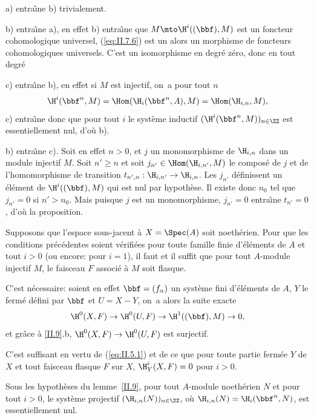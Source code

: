 a) entra\^\i ne b) trivialement.

b) entra\^\i ne a), en effet b) entra\^\i ne que $M\mto\H^i((\bbf), M)$ est un foncteur cohomologique universel, (\ref{eq:II.7.6}) est un alors un morphisme de foncteurs cohomologiques universels. C'est un isomorphisme en degr\'e z\'ero, donc en tout degr\'e

c) entra\^\i ne b), en effet si $M$ est injectif, on~a pour tout $n$
\begin{equation*} \H^i(\bbf^n, M)=\Hom(\H_i(\bbf^n, A), M) = \Hom(\H_{i, n}, M),
\end{equation*}
c) entra\^\i ne donc que pour tout $i$ le syst\`eme inductif $(\H^i(\bbf^n, M))_{n\in\ZZ}$ est essentiellement nul, d'o\`u b).

b) entra\^\i ne c). Soit en effet $n>0$, et $j$ un monomorphisme de $\H_{i, n}$ dans un module injectif $M$. Soit $n'\geq n$ et soit $j_{n'}\in\Hom(\H_{i, n'}, M)$ le compos\'e de $j$ et de l'homomorphisme de transition $t_{n', n}:\H_{i, n'}\to\H_{i, n}$. Les $j_{n'}$ d\'efinissent un \'el\'ement de $\H^i((\bbf), M)$ qui est nul par hypoth\`ese. Il existe donc $n_0$ tel que $j_{n'}=0$ si $n'>n_0$. Mais puisque $j$ est un monomorphisme, $j_{n'}=0$ entra\^\i ne $t_{n'}=0$, d'o\`u la proposition.

\begin{supcorollaire} \label{II.10} Supposons que l'espace sous-jacent \`a $X=\Spec(A)$ soit noeth\'erien. Pour que les conditions pr\'ec\'edentes soient v\'erifi\'ees pour toute famille finie d'\'el\'ements de $A$ et tout $i>0$ (ou encore: pour $i=1$), il faut et il suffit que pour tout $A$-module injectif $M$, le faisceau $F$ associ\'e \`a $M$ soit flasque.
\end{supcorollaire}

C'est n\'ecessaire: soient en effet $\bbf=(f_{\alpha})$ un syst\`eme fini d'\'el\'ements de $A$, $Y$ le ferm\'e d\'efini par $\bbf$ et $U=X-Y$, on~a alors la suite exacte
\begin{equation*} \H^0(X, F) \to \H^0(U, F) \to \H^1((\bbf), M) \to 0,
\end{equation*}
et gr\^ace \`a \ref{II.9}.b, $\H^0(X, F)\to\H^0(U, F)$ est surjectif.

C'est suffisant en vertu de (\ref{eq:II.5.1}) et de ce que pour toute partie ferm\'ee $Y$ de $X$ et tout faisceau flasque $F$ sur $X$, $\H_Y^i(X, F)=0$ pour $i>0$.

\begin{suplemme} \label{II.11} Sous les hypoth\`eses du lemme~\ref{II.9}, pour tout $A$-module noeth\'erien $N$ et pour tout $i>0$, le syst\`eme projectif $(\H_{i, n}(N))_{n\in\ZZ}$, o\`u $\H_{i, n}(N)=\H_i(\bbf^n, N)$, est essentiellement nul.
\end{suplemme}

